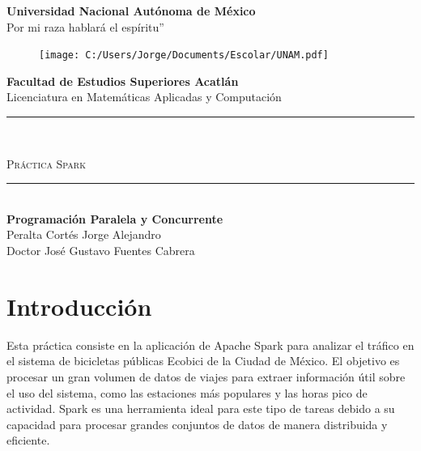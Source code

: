 \documentclass[12pt]{article}
\begin{document}
\begin{titlepage}
\begin{center}
{\huge \textbf{Universidad Nacional Aut\'onoma de M\'exico}}\\
\vspace{3mm}
{\LARGE {Por mi raza hablará el espíritu''}}\\
\vspace{3mm}
\begin{figure}[H] %
\centering
\texttt{[image: C:/Users/Jorge/Documents/Escolar/UNAM.pdf]} %
\end{figure}
{\LARGE \textbf{Facultad de Estudios Superiores Acatlán}}\\
\vspace{3mm}
{\LARGE Licenciatura en Matemáticas Aplicadas y Computación}\\
\vspace{5mm}
\textcolor{oro}{\rule{\linewidth}{1mm}}\\
\vspace{2mm}
\begin{spacing}{1.5}
{\LARGE \textsc{Práctica Spark}} %
\end{spacing}
\textcolor{oro}{\rule{\linewidth}{1mm}}\\
\vspace{1cm}
{\LARGE \textbf{Programación Paralela y Concurrente}}\\ %
\vspace{5mm}
\vspace{4mm}
{\LARGE {Peralta Cortés Jorge Alejandro}}\\ %
\vspace{4mm}
\vspace{4mm}
\vspace{1cm}
{\LARGE {Doctor José Gustavo Fuentes Cabrera}}\\ %
\end{center}
\vfill %
\end{titlepage}

\newpage

\section{Introducción}
    Esta práctica consiste en la aplicación de Apache Spark para analizar el tráfico en el sistema de bicicletas públicas Ecobici de la Ciudad de México. El objetivo es procesar un gran volumen de datos de viajes para extraer información útil sobre el uso del sistema, como las estaciones más populares y las horas pico de actividad. Spark es una herramienta ideal para este tipo de tareas debido a su capacidad para procesar grandes conjuntos de datos de manera distribuida y eficiente.
\end{document}

